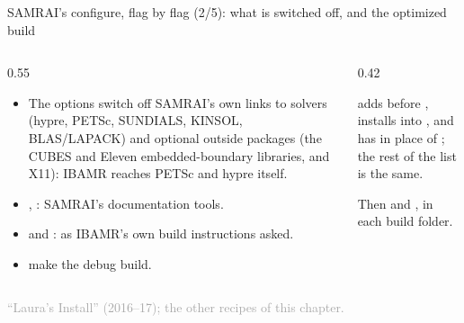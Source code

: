 \documentclass[aspectratio=169,11pt]{beamer}
\newcommand{\sourcecredit}[1]{\vfill\begin{flushright}\tiny\textcolor{DarkGray}{#1}\end{flushright}}
\begin{document}
\begin{frame}{SAMRAI's configure, flag by flag (2/5): what is switched off, and the optimized build}
\label{fr:samraiflags2}
\begin{columns}[T,onlytextwidth]
\begin{column}{0.55\textwidth}
\small
\begin{itemize}\setlength{\itemsep}{3pt}
  \item The  options switch off SAMRAI's own links to solvers (hypre, PETSc, SUNDIALS, KINSOL, BLAS/LAPACK) and optional outside packages (the CUBES and Eleven embedded-boundary libraries, and X11): IBAMR reaches PETSc and hypre itself.
  \item {}, : SAMRAI's documentation tools.
  \item {} and : as IBAMR's own build instructions asked.
  \item {} make the debug build.
\end{itemize}
\end{column}
\begin{column}{0.42\textwidth}
\begin{punchbox}
\small {} adds  before , installs into , and has  in place of ; the rest of the list is the same.
\end{punchbox}
\vspace{2mm}
\footnotesize Then  and , in each build folder.
\end{column}
\end{columns}
\sourcecredit{``Laura's Install'' (2016--17); the other recipes of this chapter.}
\end{frame}
\end{document}
